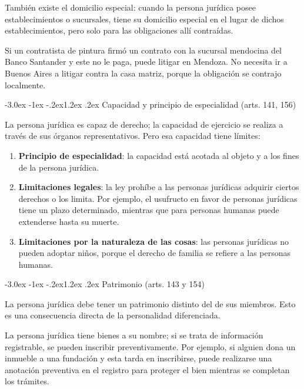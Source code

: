 \documentclass[12pt,oneside]{book}
\makeatletter
\renewcommand\section{\@startsection{section}{1}{\z@}%
  {-3.0ex \@plus -1ex \@minus -.2ex}{1.2ex \@plus .2ex}%
  {\normalfont\large\bfseries\color{acento}}}
\makeatother
\begin{document}
También existe el domicilio especial: cuando la persona jurídica posee establecimientos o sucursales, tiene su domicilio especial en el lugar de dichos establecimientos, pero solo para las obligaciones allí contraídas.

\begin{ejemplo}
Si un contratista de pintura firmó un contrato con la sucursal mendocina del Banco Santander y este no le paga, puede litigar en Mendoza. No necesita ir a Buenos Aires a litigar contra la casa matriz, porque la obligación se contrajo localmente.
\end{ejemplo}

\section{Capacidad y principio de especialidad (arts. 141, 156)}

La persona jurídica es capaz de derecho; la capacidad de ejercicio se realiza a través de sus órganos representativos. Pero esa capacidad tiene límites:

\begin{enumerate}
    \item \textbf{Principio de especialidad}: la capacidad está acotada al objeto y a los fines de la persona jurídica.
    \item \textbf{Limitaciones legales}: la ley prohíbe a las personas jurídicas adquirir ciertos derechos o los limita. Por ejemplo, el usufructo en favor de personas jurídicas tiene un plazo determinado, mientras que para personas humanas puede extenderse hasta su muerte.
    \item \textbf{Limitaciones por la naturaleza de las cosas}: las personas jurídicas no pueden adoptar niños, porque el derecho de familia se refiere a las personas humanas.
\end{enumerate}

\section{Patrimonio (arts. 143 y 154)}

La persona jurídica debe tener un patrimonio distinto del de sus miembros. Esto es una consecuencia directa de la personalidad diferenciada.

La persona jurídica tiene bienes a su nombre; si se trata de información registrable, se pueden inscribir preventivamente. Por ejemplo, si alguien dona un inmueble a una fundación y esta tarda en inscribirse, puede realizarse una anotación preventiva en el registro para proteger el bien mientras se completan los trámites.
\end{document}
